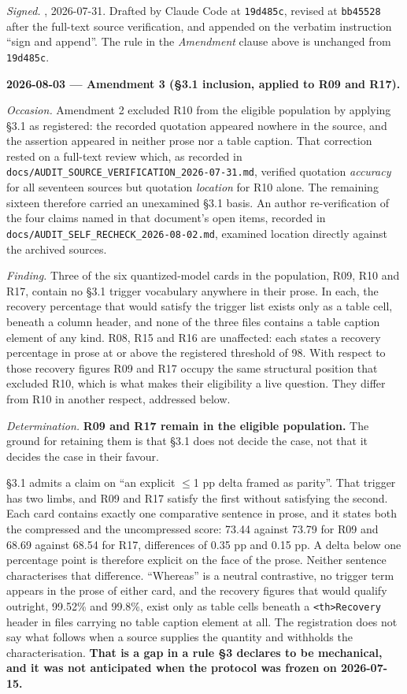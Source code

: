 \emph{Signed.} \authorname{}, 2026-07-31. Drafted by Claude Code at \texttt{19d485c}, revised at \texttt{bb45528} after the full-text source verification, and appended on the verbatim instruction ``sign and append''. The rule in the \emph{Amendment} clause above is unchanged from \texttt{19d485c}.

\textbf{2026-08-03 --- Amendment 3 (\S{}3.1 inclusion, applied to R09 and R17).}

\emph{Occasion.} Amendment 2 excluded R10 from the eligible population by applying \S{}3.1 as registered: the recorded quotation appeared nowhere in the source, and the assertion appeared in neither prose nor a table caption. That correction rested on a full-text review which, as recorded in \texttt{docs/\allowbreak{}AUDIT\_SOURCE\_VERIFICATION\_2026-\allowbreak{}07-\allowbreak{}31.md}, verified quotation \emph{accuracy} for all seventeen sources but quotation \emph{location} for R10 alone. The remaining sixteen therefore carried an unexamined \S{}3.1 basis. An author re-verification of the four claims named in that document's open items, recorded in \texttt{docs/\allowbreak{}AUDIT\_SELF\_RECHECK\_2026-\allowbreak{}08-\allowbreak{}02.md}, examined location directly against the archived sources.

\emph{Finding.} Three of the six quantized-model cards in the population, R09, R10 and R17, contain no \S{}3.1 trigger vocabulary anywhere in their prose. In each, the recovery percentage that would satisfy the trigger list exists only as a table cell, beneath a column header, and none of the three files contains a table caption element of any kind. R08, R15 and R16 are unaffected: each states a recovery percentage in prose at or above the registered threshold of 98. With respect to those recovery figures R09 and R17 occupy the same structural position that excluded R10, which is what makes their eligibility a live question. They differ from R10 in another respect, addressed below.

\emph{Determination.} \textbf{R09 and R17 remain in the eligible population.} The ground for retaining them is that \S{}3.1 does not decide the case, not that it decides the case in their favour.

\S{}3.1 admits a claim on ``an explicit $\leq$1 pp delta framed as parity''. That trigger has two limbs, and R09 and R17 satisfy the first without satisfying the second. Each card contains exactly one comparative sentence in prose, and it states both the compressed and the uncompressed score: 73.44 against 73.79 for R09 and 68.69 against 68.54 for R17, differences of 0.35 pp and 0.15 pp. A delta below one percentage point is therefore explicit on the face of the prose. Neither sentence characterises that difference. ``Whereas'' is a neutral contrastive, no trigger term appears in the prose of either card, and the recovery figures that would qualify outright, 99.52\% and 99.8\%, exist only as table cells beneath a \texttt{<th>Recovery} header in files carrying no table caption element at all. The registration does not say what follows when a source supplies the quantity and withholds the characterisation. \textbf{That is a gap in a rule \S{}3 declares to be mechanical, and it was not anticipated when the protocol was frozen on 2026-07-15.}

